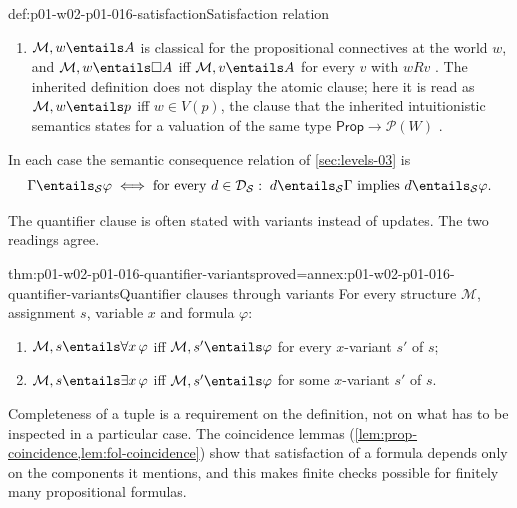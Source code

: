 \begin{hbdefinition}{def:p01-w02-p01-016-satisfaction}{Satisfaction relation}
\begin{enumerate}
  \item \(\mathcal M,w\entails A\) is classical for the propositional
        connectives at the world \(w\), and
        \(\mathcal M,w\entails\Box A\) iff \(\mathcal M,v\entails A\) for
        every \(v\) with \(wRv\) \cite[ch.~``Modal, Temporal, and Epistemic
        Logic'', definition ``Kripke frame and Kripke
        structure'']{FrozenFormalLogicSemanticData}. The inherited definition
        does not display the atomic clause; here it is read as
        \(\mathcal M,w\entails p\) iff \(w\in V(p)\), the clause that the
        inherited intuitionistic semantics states for a valuation of the same
        type \(\mathsf{Prop}\to\mathcal P(W)\) \cite[ch.~``Intuitionistic
        Logic'', forcing relation following definition ``Intuitionistic
        Kripke frame and structure'']{FrozenFormalLogicSemanticData}.
\end{enumerate}
In each case the semantic consequence relation of \cref{sec:levels-03} is
\[
  \Gamma\entails_{\mathcal S}\varphi
  \iff
  \text{for every }d\in\mathcal D_{\mathcal S}:\;
  d\entails_{\mathcal S}\Gamma\text{ implies }d\entails_{\mathcal S}\varphi .
\]
\end{hbdefinition}

The quantifier clause is often stated with variants instead of updates. The
two readings agree.

\begin{hbtheorem}{thm:p01-w02-p01-016-quantifier-variants}{proved=annex:p01-w02-p01-016-quantifier-variants}{Quantifier clauses through variants}
For every structure \(\mathcal M\), assignment \(s\), variable \(x\) and
formula \(\varphi\):
\begin{enumerate}
  \item \(\mathcal M,s\entails\forall x\,\varphi\) iff
        \(\mathcal M,s'\entails\varphi\) for every \(x\)-variant \(s'\) of
        \(s\);
  \item \(\mathcal M,s\entails\exists x\,\varphi\) iff
        \(\mathcal M,s'\entails\varphi\) for some \(x\)-variant \(s'\) of
        \(s\).
\end{enumerate}
\end{hbtheorem}

Completeness of a tuple is a requirement on the definition, not on what has
to be inspected in a particular case. The coincidence lemmas
(\cref{lem:prop-coincidence,lem:fol-coincidence}) show that satisfaction of
a formula depends only on the components it mentions, and this makes finite
checks possible for finitely many propositional formulas.

